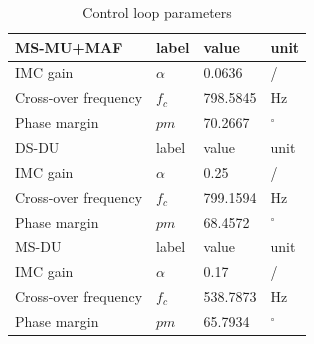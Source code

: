 \documentclass[journal]{IEEEtran}
\begin{document}
\begin{table}[h!]
			  \caption{Control loop parameters}
              \label{tab:an_param}
              \centering
              \begin{tabular}{llll}
                           \midrule\midrule
        MS-MU+MAF & label & value   & unit\\
        \midrule               
                  IMC gain	& $\alpha$ & 0.0636 & /\\  
                  Cross-over frequency  & $f_{c}$ & 798.5845 & Hz   \\
                  Phase margin  & $pm$ & 70.2667 &  $^\circ$  \\
                  \midrule\midrule
        DS-DU & label & value   & unit\\
        \midrule               
                  IMC gain	& $\alpha$ & 0.25 & /\\  
                  Cross-over frequency  & $f_{c}$ & 799.1594 & Hz   \\
                  Phase margin  & $pm$ & 68.4572 &  $^\circ$  \\
                  \midrule\midrule
        MS-DU & label & value   & unit\\
        \midrule               
                  IMC gain	& $\alpha$ & 0.17 & /\\  
                  Cross-over frequency  & $f_{c}$ & 538.7873 & Hz   \\
                  Phase margin  & $pm$ & 65.7934 &  $^\circ$  \\
                  \midrule\midrule
                                                        
              \end{tabular}
\end{table}
\end{document}
